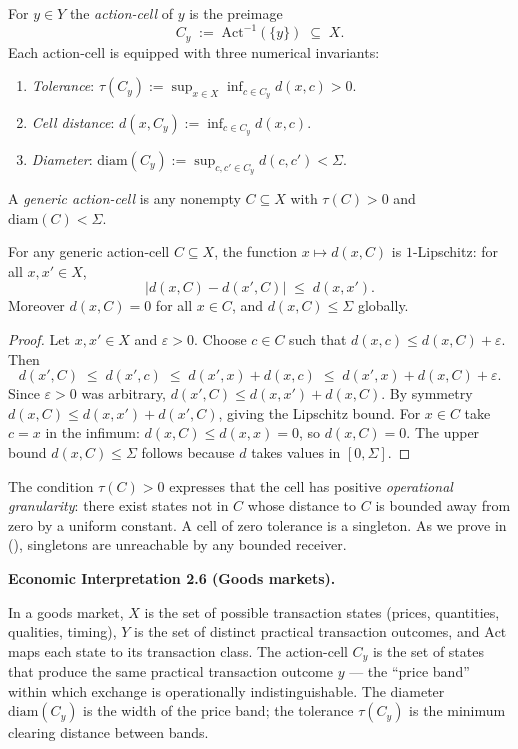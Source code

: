 \documentclass[twocolumn,11pt,a4paper]{article}
\newenvironment{econinterp}[1]{%
  \medskip\noindent\textbf{Economic Interpretation #1.}\normalfont\itshape\space
}{%
  \medskip
}
\newcommand{\eps}{\varepsilon}
\newcommand{\abs}[1]{\lvert#1\rvert}
\newcommand{\diam}{\mathrm{diam}}
\newcommand{\Action}{\mathrm{Act}}
\begin{document}
\begin{definition}
\label{def:cell}
For $y\in Y$ the \emph{action-cell} of $y$ is the preimage
\[
  C_y \;:=\; \Action^{-1}(\{y\}) \;\subseteq\; X.
\]
Each action-cell is equipped with three numerical invariants:
\begin{enumerate}[label=(\alph*),leftmargin=*]
  \item \emph{Tolerance}: $\tau(C_y):=\sup_{x\in X}\inf_{c\in C_y}
    d(x,c)>0$.
  \item \emph{Cell distance}: $d(x,C_y):=\inf_{c\in C_y}d(x,c)$.
  \item \emph{Diameter}: $\diam(C_y):=\sup_{c,c'\in C_y}d(c,c')<\Sigma$.
\end{enumerate}
A \emph{generic action-cell} is any nonempty $C\subseteq X$ with
$\tau(C)>0$ and $\diam(C)<\Sigma$.
\end{definition}

\begin{proposition}
\label{prop:celldistmetric}
For any generic action-cell $C\subseteq X$, the function
$x\mapsto d(x,C)$ is $1$-Lipschitz: for all $x,x'\in X$,
\[
  \abs{d(x,C)-d(x',C)}\;\leq\;d(x,x').
\]
Moreover $d(x,C)=0$ for all $x\in C$, and $d(x,C)\leq\Sigma$ globally.
\end{proposition}

\begin{proof}
Let $x,x'\in X$ and $\eps>0$.  Choose $c\in C$ such that
$d(x,c)\leq d(x,C)+\eps$.  Then
\[
  d(x',C)\;\leq\;d(x',c)\;\leq\;d(x',x)+d(x,c)\;\leq\;d(x',x)+d(x,C)+\eps.
\]
Since $\eps>0$ was arbitrary, $d(x',C)\leq d(x,x')+d(x,C)$.  By
symmetry $d(x,C)\leq d(x,x')+d(x',C)$, giving the Lipschitz bound.
For $x\in C$ take $c=x$ in the infimum: $d(x,C)\leq d(x,x)=0$, so
$d(x,C)=0$.  The upper bound $d(x,C)\leq\Sigma$ follows because $d$
takes values in $[0,\Sigma]$.
\end{proof}

\begin{remark}
\label{rem:granularity}
The condition $\tau(C)>0$ expresses that the cell has positive
\emph{operational granularity}: there exist states not in $C$ whose
distance to $C$ is bounded away from zero by a uniform constant.  A cell
of zero tolerance is a singleton.  As we prove in 
(), singletons are unreachable by any bounded
receiver.
\end{remark}

\begin{econinterp}{2.6 (Goods markets)}
In a goods market, $X$ is the set of possible transaction states
(prices, quantities, qualities, timing), $Y$ is the set of distinct
practical transaction outcomes, and $\Action$ maps each state to its
transaction class.  The action-cell $C_y$ is the set of states that
produce the same practical transaction outcome $y$ — the ``price band''
within which exchange is operationally indistinguishable.  The diameter
$\diam(C_y)$ is the width of the price band; the tolerance $\tau(C_y)$
is the minimum clearing distance between bands.
\end{econinterp}
\end{document}
